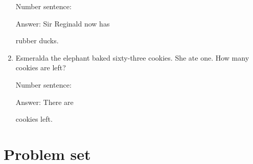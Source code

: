 \documentclass{tufte-book}
\begin{document}
\begin{enumerate}
  Number sentence:
  \dotfill\medskip\par
  Answer: Sir Reginald now has
  \dotfill\medskip\par\mbox{}\dotfill\medskip\par\mbox{}\dotfill\bigskip
  rubber ducks.
\item
  Esmeralda the elephant baked sixty-three cookies. She ate one. How
  many cookies are left?\medskip\par
  Number sentence:
  \dotfill\medskip\par
  Answer: There are
  \dotfill\medskip\par\mbox{}\dotfill\medskip\par\mbox{}\dotfill\bigskip
  cookies left.
\end{enumerate}



\clearpage\section{Problem set }
\end{document}
